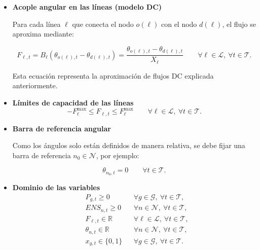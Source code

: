 \begin{enumerate}
\begin{itemize}
    \begin{equation}
    \sum_{g\in\mathcal{G}(n)} P_{g,t}
    + ENS_{n,t}
    + \sum_{\ell\,:\,d(\ell)=n} F_{\ell,t}
    - \sum_{\ell\,:\,o(\ell)=n} F_{\ell,t}
    = D_{n,t}
    \qquad \forall n\in\mathcal{N},\ \forall t\in\mathcal{T}.
    \end{equation}

    Esta ecuación corresponde a aplicar LCK en cada nodo.

    \item \textbf{Acople angular en las líneas (modelo DC)}

    Para cada línea \(\ell\) que conecta el nodo \(o(\ell)\) con el nodo \(d(\ell)\), el flujo se aproxima mediante:

    \begin{equation}
    F_{\ell,t} = B_\ell\left(\theta_{o(\ell),t}-\theta_{d(\ell),t}\right)
    = \frac{\theta_{o(\ell),t}-\theta_{d(\ell),t}}{X_\ell}
    \qquad \forall \ell\in\mathcal{L},\ \forall t\in\mathcal{T}.
    \end{equation}

    Esta ecuación representa la aproximación de flujos DC explicada anteriormente.

    \item \textbf{Límites de capacidad de las líneas}
    \begin{equation}
        -F_\ell^{\max} \le F_{\ell,t} \le F_\ell^{\max}
        \qquad \forall \ell\in\mathcal{L},\ \forall t\in\mathcal{T}.
    \end{equation}

    \item \textbf{Barra de referencia angular}

    Como los ángulos solo están definidos de manera relativa, se debe fijar una barra de referencia \(n_0\in\mathcal{N}\), por ejemplo:

    \begin{equation}
        \theta_{n_0,t}=0
        \qquad \forall t\in\mathcal{T}.
    \end{equation}

    \item \textbf{Dominio de las variables}
    \begin{align}
        &P_{g,t}\ge 0
        &&\forall g\in\mathcal{G},\ \forall t\in\mathcal{T},\\
        &ENS_{n,t}\ge 0
        &&\forall n\in\mathcal{N},\ \forall t\in\mathcal{T},\\
        &F_{\ell,t}\in\mathbb{R}
        &&\forall \ell\in\mathcal{L},\ \forall t\in\mathcal{T},\\
        &\theta_{n,t}\in\mathbb{R}
        &&\forall n\in\mathcal{N},\ \forall t\in\mathcal{T},\\
        &x_{g,t}\in\{0,1\}
        &&\forall g\in\mathcal{G},\ \forall t\in\mathcal{T}.
    \end{align}
\end{itemize}


\end{enumerate}
